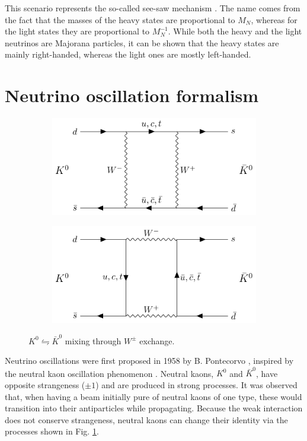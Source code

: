 This scenario represents the so-called see-saw mechanism \cite{Minkowski1977,Gell-Mann1979,Yanagida1979,Mohapatra1979,Schechter1980}. The name comes from the fact that the masses of the heavy states are proportional to $M_{N}$, whereas for the light states they are proportional to $M_{N}^{-1}$. While both the heavy and the light neutrinos are Majorana particles, it can be shown that the heavy states are mainly right-handed, whereas the light ones are mostly left-handed.

\section{Neutrino oscillation formalism}

\begin{figure}[t]
	\begin{subfigure}{0.5\textwidth}
		\centering
		\includegraphics[width=.90\linewidth]{Images/Nu/feynman_kaon_1.pdf}
	\end{subfigure}
	\begin{subfigure}{0.5\textwidth}
		\centering
		\includegraphics[width=.90\linewidth]{Images//Nu/feynman_kaon_2.pdf}
	\end{subfigure}
	\caption{$K^{0} \leftrightharpoons \bar{K}^{0}$ mixing through $W^{\pm}$ exchange.}
	\label{fig:kaon_oscillations}
\end{figure}

Neutrino oscillations were first proposed in 1958 by B. Pontecorvo \cite{Pontecorvo1957a}, inspired by the neutral kaon oscillation phenomenon \cite{Gell-Mann1955}. Neutral kaons, $K^{0}$ and $\bar{K}^{0}$, have opposite strangeness ($\pm 1$) and are produced in strong processes. It was observed that, when having a beam initially pure of neutral kaons of one type, these would transition into their antiparticles while propagating. Because the weak interaction does not conserve strangeness, neutral kaons can change their identity via the processes shown in Fig. \ref{fig:kaon_oscillations}.

